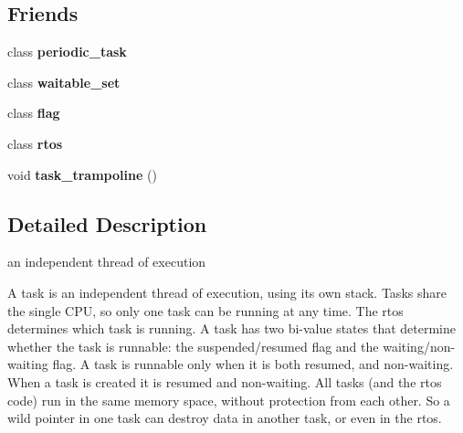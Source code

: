 \subsection*{Friends}
\begin{DoxyCompactItemize}
\item 
class {\bfseries periodic\+\_\+task}\hypertarget{classrtos_1_1task__base_a01d2f5a71b8cd797b5f01fb6940ea353}{}\label{classrtos_1_1task__base_a01d2f5a71b8cd797b5f01fb6940ea353}

\item 
class {\bfseries waitable\+\_\+set}\hypertarget{classrtos_1_1task__base_a0ee29d8961a0b67cea2c3fa76da116da}{}\label{classrtos_1_1task__base_a0ee29d8961a0b67cea2c3fa76da116da}

\item 
class {\bfseries flag}\hypertarget{classrtos_1_1task__base_a2d8be07618a92a592c4905e969f9927f}{}\label{classrtos_1_1task__base_a2d8be07618a92a592c4905e969f9927f}

\item 
class {\bfseries rtos}\hypertarget{classrtos_1_1task__base_a2a7bcfc34141352757ad672e3ecd099f}{}\label{classrtos_1_1task__base_a2a7bcfc34141352757ad672e3ecd099f}

\item 
void {\bfseries task\+\_\+trampoline} ()\hypertarget{classrtos_1_1task__base_a376fdffc11fe9fb4f531835b94320825}{}\label{classrtos_1_1task__base_a376fdffc11fe9fb4f531835b94320825}

\end{DoxyCompactItemize}


\subsection{Detailed Description}
an independent thread of execution 

A task is an independent thread of execution, using its own stack. Tasks share the single C\+PU, so only one task can be running at any time. The rtos determines which task is running. A task has two bi-\/value states that determine whether the task is runnable\+: the suspended/resumed flag and the waiting/non-\/waiting flag. A task is runnable only when it is both resumed, and non-\/waiting. When a task is created it is resumed and non-\/waiting. All tasks (and the rtos code) run in the same memory space, without protection from each other. So a \textquotesingle{}wild pointer\textquotesingle{} in one task can destroy data in another task, or even in the rtos.


